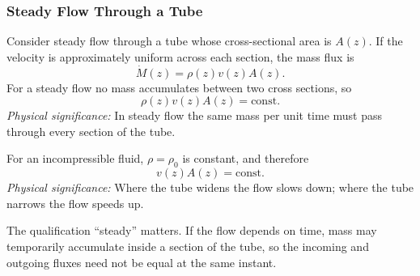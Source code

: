 \documentclass[../main.tex]{subfiles}
\begin{document}
\subsubsection{Steady Flow Through a Tube}\label{subsec:lec12:steady-tube}
Consider steady flow through a tube whose cross-sectional area is $A(z)$. If the velocity is approximately uniform across each section, the mass flux is
\begin{equation}
  \dot{M}(z)=\rho(z)v(z)A(z).
  \label{eq:lec12_tube_mass_flux}
\end{equation}
For a steady flow no mass accumulates between two cross sections, so
\begin{equation}
  \boxed{\rho(z)v(z)A(z)=\mathrm{const}.}
  \label{eq:lec12_tube_continuity}
\end{equation}
\textit{Physical significance:} In steady flow the same mass per unit time must pass through every section of the tube.

\begin{center}
\end{center}

For an incompressible fluid, $\rho=\rho_0$ is constant, and therefore
\begin{equation}
  \boxed{v(z)A(z)=\mathrm{const}.}
  \label{eq:lec12_incompressible_tube}
\end{equation}
\textit{Physical significance:} Where the tube widens the flow slows down; where the tube narrows the flow speeds up.

The qualification ``steady'' matters. If the flow depends on time, mass may temporarily accumulate inside a section of the tube, so the incoming and outgoing fluxes need not be equal at the same instant.
\end{document}
